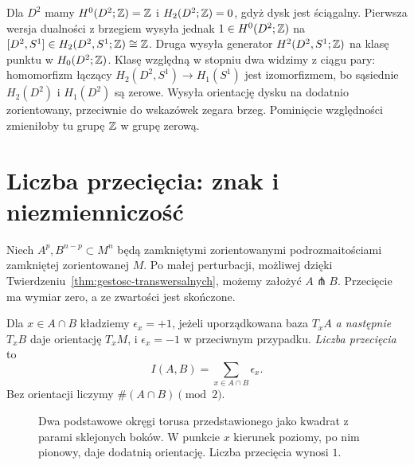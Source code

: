\begin{przyklad}
\label{prz:pd-dysk-21}
Dla $D^2$ mamy $H^0(D^2;\mathbb{Z})=\mathbb{Z}$ i
$H_2(D^2;\mathbb{Z})=0$, gdyż dysk jest ściągalny.
Pierwsza wersja dualności z brzegiem wysyła jednak
$1\in H^0(D^2;\mathbb{Z})$ na
$[D^2,S^1]\in H_2(D^2,S^1;\mathbb{Z})\cong\mathbb{Z}$.
Druga wysyła generator $H^2(D^2,S^1;\mathbb{Z})$ na klasę
punktu w $H_0(D^2;\mathbb{Z})$.
Klasę względną w stopniu dwa widzimy z ciągu pary:
homomorfizm łączący
$H_2(D^2,S^1)\to H_1(S^1)$ jest izomorfizmem,
bo sąsiednie $H_2(D^2)$ i $H_1(D^2)$ są zerowe.
Wysyła orientację dysku na dodatnio zorientowany,
przeciwnie do wskazówek zegara brzeg.
Pominięcie względności zmieniłoby tu grupę $\mathbb{Z}$ w grupę zerową.
\end{przyklad}

\section{Liczba przecięcia: znak i niezmienniczość}
\label{sec:przeciecia-16}

Niech $A^p,B^{n-p}\subset M^n$ będą
zamkniętymi zorientowanymi
podrozmaitościami zamkniętej
zorientowanej $M$. Po małej
perturbacji, możliwej dzięki
Twierdzeniu~\ref{thm:gestosc-transwersalnych},
możemy założyć $A\pitchfork B$.
Przecięcie ma wymiar zero,
a ze zwartości jest skończone.

\begin{definicja}
\label{def:liczba-przeciecia-16}
Dla $x\in A\cap B$ kładziemy
$\epsilon_x=+1$, jeżeli
uporządkowana baza
$T_xA$ \emph{a następnie}
$T_xB$ daje orientację $T_xM$,
i $\epsilon_x=-1$ w przeciwnym
przypadku. \emph{Liczba
przecięcia} to
\[
 I(A,B)=\sum_{x\in A\cap B}\epsilon_x.
\]
Bez orientacji liczymy
$\#(A\cap B)\pmod 2$.
\end{definicja}

\begin{figure}[H]
\centering
{}
\caption{Dwa podstawowe okręgi torusa
przedstawionego jako kwadrat z parami
sklejonych boków. W punkcie $x$ kierunek
poziomy, po nim pionowy, daje dodatnią
orientację. Liczba przecięcia wynosi $1$.}
\label{fig:przeciecie-torus-16}
\end{figure}

